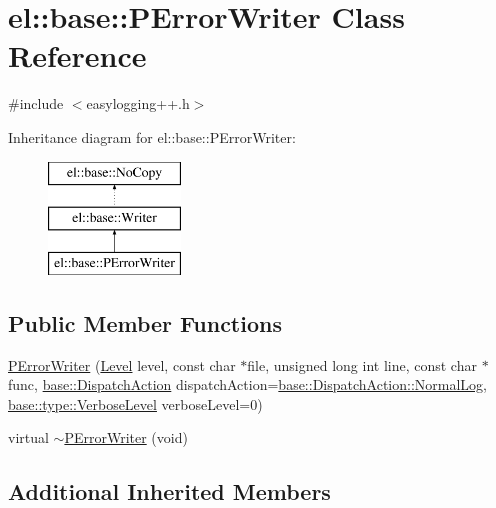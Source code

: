 \hypertarget{classel_1_1base_1_1_p_error_writer}{}\section{el\+:\+:base\+:\+:P\+Error\+Writer Class Reference}
\label{classel_1_1base_1_1_p_error_writer}


{\ttfamily \#include $<$easylogging++.\+h$>$}

Inheritance diagram for el\+:\+:base\+:\+:P\+Error\+Writer\+:\begin{figure}[H]
\begin{center}
\leavevmode
\includegraphics[height=3.000000cm]{classel_1_1base_1_1_p_error_writer}
\end{center}
\end{figure}
\subsection*{Public Member Functions}
\begin{DoxyCompactItemize}
\item 
\hyperlink{classel_1_1base_1_1_p_error_writer_a60d1ff92d16e3927e2c4b5bb77d34092}{P\+Error\+Writer} (\hyperlink{namespaceel_ab0ac6091262344c52dd2d3ad099e8e36}{Level} level, const char $\ast$file, unsigned long int line, const char $\ast$func, \hyperlink{namespaceel_1_1base_a3aa2563d38e47388ba242a1694fc2839}{base\+::\+Dispatch\+Action} dispatch\+Action=\hyperlink{namespaceel_1_1base_a3aa2563d38e47388ba242a1694fc2839a44d8ee68145a7d9849eeaa634c443602}{base\+::\+Dispatch\+Action\+::\+Normal\+Log}, \hyperlink{namespaceel_1_1base_1_1type_a3f79fa74639a13c32f794ba074fe7fb4}{base\+::type\+::\+Verbose\+Level} verbose\+Level=0)
\item 
virtual \hyperlink{classel_1_1base_1_1_p_error_writer_a29754e846334ec7bbf2e780d2f28887f}{$\sim$\+P\+Error\+Writer} (void)
\end{DoxyCompactItemize}
\subsection*{Additional Inherited Members}


